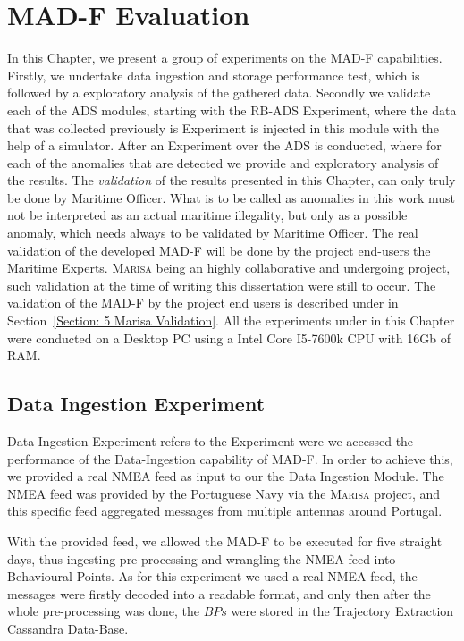 \chapter{MAD-F Evaluation}
\label{chapter:Chapter 5}

In this Chapter, we present a group of experiments on the MAD-F capabilities. Firstly, we undertake data ingestion and storage performance test, which is followed by a exploratory analysis of the gathered data. Secondly we validate each of the ADS modules, starting with the RB-ADS Experiment, where the data that was collected previously is Experiment is injected in this module with the help of a simulator. After an Experiment over the ADS is conducted, where for each of the anomalies that are detected we provide and exploratory analysis of the results.
The \emph{validation} of the results presented in this Chapter, can only truly be done by Maritime Officer. What is to be called as anomalies in this work must not be interpreted as an actual maritime illegality, but only as a possible anomaly, which needs always to be validated by Maritime Officer. The real validation of the developed MAD-F will be done by the project end-users the Maritime Experts. \textsc{Marisa} being an highly collaborative and undergoing project, such validation at the time of writing this dissertation were still to occur. The validation of the MAD-F by the project end users is described under in Section~\ref{Section: 5 Marisa Validation}. 
All the experiments under in this Chapter were conducted on a Desktop PC using a Intel Core I5-7600k CPU with 16Gb of RAM.

\section{Data Ingestion Experiment}
\label{section: Experiment Data}
Data Ingestion Experiment refers to the Experiment were we accessed the performance of the Data-Ingestion capability of MAD-F. In order to achieve this, we provided a real NMEA feed as input to our the Data Ingestion Module. The NMEA feed was provided by the Portuguese Navy via the \textsc{Marisa} project, and this specific feed aggregated messages from multiple antennas around Portugal.
 
With the provided feed, we allowed the MAD-F to be executed for five straight days, thus ingesting pre-processing and wrangling the NMEA feed into Behavioural Points. As for this experiment we used a real NMEA feed, the messages were firstly decoded into a readable format, and only then after the whole pre-processing was done, the $BPs$ were stored in the Trajectory Extraction Cassandra Data-Base.

